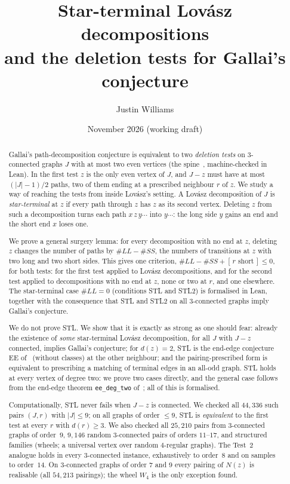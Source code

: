 \documentclass[11pt]{amsart}
\title[Star-terminal Lov\'asz decompositions]{Star-terminal Lov\'asz decompositions\\
and the deletion tests for Gallai's conjecture}
\author{Justin Williams}
\date{November 2026 (working draft)}
\theoremstyle{definition}
\newcommand{\ind}[1]{[\,#1\,]}
\begin{document}
\begin{abstract}
Gallai's path-decomposition conjecture is equivalent to two \emph{deletion tests} on $3$-connected
graphs $J$ with at most two even vertices (the spine~\cite{SP}, machine-checked in Lean). In the
first test $z$ is the only even vertex of $J$, and $J-z$ must have at most $(|J|-1)/2$ paths, two of
them ending at a prescribed neighbour $r$ of $z$. We study a way of reaching the tests from inside
Lov\'asz's setting. A Lov\'asz decomposition of $J$ is \emph{star-terminal} at $z$ if every path
through $z$ has $z$ as its second vertex. Deleting $z$ from such a decomposition turns each path
$x\,z\,y\cdots$ into $y\cdots$: the long side $y$ gains an end and the short end $x$ loses one.

We prove a general surgery lemma: for every decomposition with no end at $z$, deleting $z$
changes the number of paths by $\#LL-\#SS$, the numbers of transitions at $z$ with two long and
two short sides. This gives one criterion, $\#LL-\#SS+\ind{r\text{ short}}\le0$, for both tests:
for the first test applied to Lov\'asz decompositions, and for the second test applied to
decompositions with no end at $z$, none or two at $r$, and one elsewhere. The star-terminal case
$\#LL=0$ (conditions STL and STL2) is formalised in Lean, together with the consequence that STL
and STL2 on all $3$-connected graphs imply Gallai's conjecture.

We do not prove STL. We show that it is exactly as strong as one should fear: already the
existence of \emph{some} star-terminal Lov\'asz decomposition, for all $J$ with $J-z$ connected,
implies Gallai's conjecture; for $d(z)=2$, STL is the end-edge conjecture EE of~\cite{MS} (without classes) at
the other neighbour; and the pairing-prescribed form is equivalent to prescribing a matching of
terminal edges in an all-odd graph. STL holds at every vertex of degree two: we prove two
cases directly, and the general case follows from the end-edge theorem \texttt{ee\_deg\_two}
of~\cite{PE}; all of this is formalised.

Computationally, STL never fails when $J-z$ is connected. We checked all $44{,}336$ such pairs
$(J,r)$ with $|J|\le9$; on all graphs of order $\le9$, STL is \emph{equivalent} to the first test at
every $r$ with $d(r)\ge3$. We also
checked all $25{,}210$ pairs from $3$-connected graphs of order~$9$, $9{,}146$ random
$3$-connected pairs of orders $11$--$17$, and structured families (wheels; a universal vertex over
random $4$-regular graphs). The Test~2 analogue holds in every $3$-connected instance, exhaustively
to order~$8$ and on samples to order~$14$. On $3$-connected graphs of order $7$ and $9$ every
pairing of $N(z)$ is realisable (all $54{,}213$ pairings); the wheel $W_4$ is the only exception
found.
\end{abstract}
\maketitle
\end{document}

